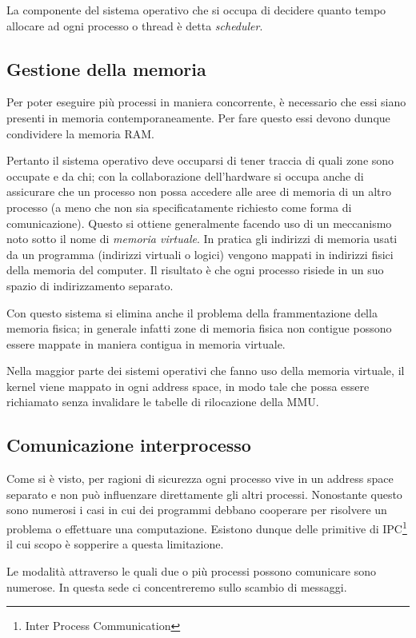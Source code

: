 \documentclass[12pt,a4paper]{report}
\begin{document}
			La componente del sistema operativo che si occupa di decidere quanto tempo allocare ad ogni processo o thread
			è detta \emph{scheduler}.
				
		\subsection{Gestione della memoria}
			Per poter eseguire più processi in maniera concorrente, è necessario che essi siano presenti in memoria
			contemporaneamente. Per fare questo essi devono dunque condividere la memoria RAM.
			
			Pertanto il sistema operativo deve occuparsi di tener traccia di quali zone sono occupate e da chi;
			con la collaborazione dell'hardware si occupa anche di assicurare che un processo non possa accedere
			alle aree di memoria di un altro processo (a meno che non sia specificatamente richiesto come forma di
			comunicazione).
			Questo si ottiene generalmente facendo uso di un meccanismo noto sotto il nome di \emph{memoria virtuale}.
			In pratica gli indirizzi di memoria usati da un programma (indirizzi virtuali o logici) vengono mappati in indirizzi
			fisici della memoria del computer. Il risultato è che ogni processo risiede in un suo spazio di indirizzamento separato.
			
			Con questo sistema si elimina anche il problema della frammentazione della memoria fisica;
			in generale infatti zone di memoria fisica non contigue possono essere mappate in maniera
			contigua in memoria virtuale.
			
			Nella maggior parte dei sistemi operativi che fanno uso della memoria virtuale, il kernel viene mappato in
			ogni address space, in modo tale che possa essere richiamato senza invalidare le tabelle di rilocazione
			della MMU.
								
		\subsection{Comunicazione interprocesso}
			Come si è visto, per ragioni di sicurezza ogni processo vive in un address space separato e non
			può influenzare direttamente gli altri processi.
			Nonostante questo sono numerosi i casi in cui dei programmi debbano cooperare per risolvere
			un problema o effettuare una computazione. Esistono dunque delle primitive di IPC\footnote{Inter Process Communication}
			il cui scopo è sopperire a questa limitazione.
					
			Le modalità attraverso le quali due o più processi possono comunicare sono numerose. In questa sede
			ci concentreremo sullo scambio di messaggi.
	
\end{document}
